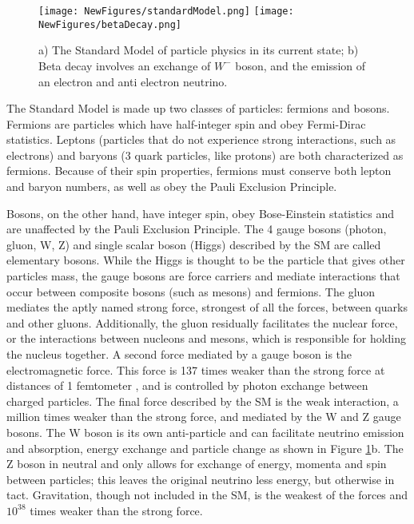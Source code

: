 \documentclass[12pt]{article}
\begin{document}
\begin{figure}[h!]
\centering
\texttt{[image: NewFigures/standardModel.png]}
\hspace{6 mm}
\texttt{[image: NewFigures/betaDecay.png]}
\caption{a) The Standard Model of particle physics in its current state; b) Beta decay involves an exchange of $W^-$ boson, and the emission of an electron and anti electron neutrino. }
\label{fig:SM}
\end{figure}
\par The Standard Model is made up two classes of particles: fermions and bosons. Fermions are particles which have half-integer spin and obey Fermi-Dirac statistics. Leptons (particles that do not experience strong interactions, such as electrons) and baryons (3 quark particles, like protons) are both characterized as fermions. Because of their spin properties, fermions must conserve both lepton and baryon numbers, as well as obey the Pauli Exclusion Principle. 
\par Bosons, on the other hand, have integer spin, obey Bose-Einstein statistics and are unaffected by the Pauli Exclusion Principle. The 4 gauge bosons (photon, gluon, W, Z) and single scalar boson (Higgs) described by the SM are called elementary bosons. While the Higgs is thought to be the particle that gives other particles mass, the gauge bosons are force carriers and mediate interactions that occur between composite bosons (such as mesons) and fermions.  The gluon mediates the aptly named strong force, strongest of all the forces, between quarks and other gluons. Additionally, the gluon residually facilitates the nuclear force, or the interactions between nucleons and mesons, which is responsible for holding the nucleus together. A second force mediated by a gauge boson is the electromagnetic force.  This force is 137 times weaker than the strong force at distances of 1 femtometer \cite{bib:forces}, and is controlled by photon exchange between charged particles. The final force described by the SM is the weak interaction, a million times weaker than the strong force, and mediated by the W and Z gauge bosons.  The W boson is its own anti-particle and can facilitate neutrino emission and absorption, energy exchange and particle change as shown in Figure \ref{fig:SM}b. The Z boson in neutral and only allows for exchange of energy, momenta and spin between particles; this leaves the original neutrino less energy, but otherwise in tact. Gravitation, though not included in the SM, is the weakest of the forces and $10^{38}$ times weaker than the strong force.
\end{document}
